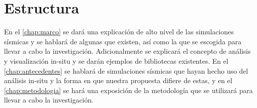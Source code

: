 \section{Estructura}
En el \cref{chap:marco} se dará una explicación de alto nivel de las simulaciones sísmicas y se hablará de algunas que existen, así como la que se escogida para llevar a cabo la investigación. Adicionalmente se explicará el concepto de análisis y visualización in-situ y se darán ejemplos de bibliotecas existentes.
En el \cref{chap:antecedentes} se hablará de simulaciones sísmicas que hayan hecho uso del análisis in-situ y la forma en que nuestra propuesta difiere de estas, y en el \cref{chap:metodologia} se hará una exposición de la metodología que se utilizará para llevar a cabo la investigación.


